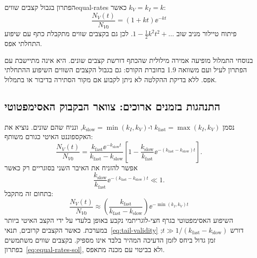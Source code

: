 \begin{corollary}{הפתרון בגבול קצבים שווים}{equal-rates}
כאשר $k_V = k_I = k$:
\begin{equation}\label{eq:equal-rates-sol}
\boxed{\frac{N_V(t)}{N_{V0}} = (1 + k t)\ee^{-k t}}
\end{equation}
פיתוח טיילור מניב שוב $1 - \frac{1}{2} k^2 t^2 + \dots$. לכן גם בקצבים שווים מתקבלת כתף עם שיפוע התחלתי אפס.
\end{corollary}

\begin{remark}
בנוסחי התמלול מופיעה אמירה מילולית שהכתף דורשת קצבים שונים. היא אינה מתיישבת עם הפתרון לעיל ועם משוואה 1.9 בחוברת הקורס: גם בגבול הקצבים השווים השיפוע ההתחלתי אפס. ללא בדיקת ההקלטה לא ניתן לקבוע אם מקור הסתירה בדיבור או בתמלול.
\end{remark}

\subsection{התנהגות בזמנים ארוכים: צוואר הבקבוק האסימפטוטי}\label{sec:hiv-asymptotics}
נסמן $k_{\mathrm{fast}}=\max(k_I,k_V)$ ו-$k_{\mathrm{slow}}=\min(k_I,k_V)$, ונניח שהם שונים. נוציא את האקספוננט האיטי כגורם משותף:
\begin{equation}\label{eq:tail-factorization}
\frac{N_V(t)}{N_{V0}}=
\frac{k_{\mathrm{fast}}\ee^{-k_{\mathrm{slow}}t}}{k_{\mathrm{fast}}-k_{\mathrm{slow}}}
\left[1-\frac{k_{\mathrm{slow}}}{k_{\mathrm{fast}}}\ee^{-(k_{\mathrm{fast}}-k_{\mathrm{slow}})t}\right].
\end{equation}
אפשר להזניח את האיבר השני בסוגריים רק כאשר
\begin{equation}\label{eq:tail-validity}
\frac{k_{\mathrm{slow}}}{k_{\mathrm{fast}}}\ee^{-(k_{\mathrm{fast}}-k_{\mathrm{slow}})t}\ll1.
\end{equation}
בתחום זה מתקבל:
\begin{equation}\label{eq:asymptotic-tail}
\frac{N_V(t)}{N_{V0}} \approx \left(\frac{k_{\mathrm{fast}}}{k_{\mathrm{fast}} - k_{\mathrm{slow}}}\right) \ee^{-\min(k_I, k_V) t}
\end{equation}
השיפוע האסימפטוטי בגרף חצי-לוגריתמי נקבע באופן בלעדי על ידי הקצב האיטי ביותר במערכת.
כאשר הקצבים קרובים, תנאי~\eqref{eq:tail-validity} דורש $t\gg1/(k_{\mathrm{fast}}-k_{\mathrm{slow}})$; זמן גדול ביחס לזמן הדעיכה המהיר בלבד אינו מספיק. בקצבים שווים משתמשים בפתרון~\eqref{eq:equal-rates-sol}, ולא בביטוי עם מכנה מתאפס.


